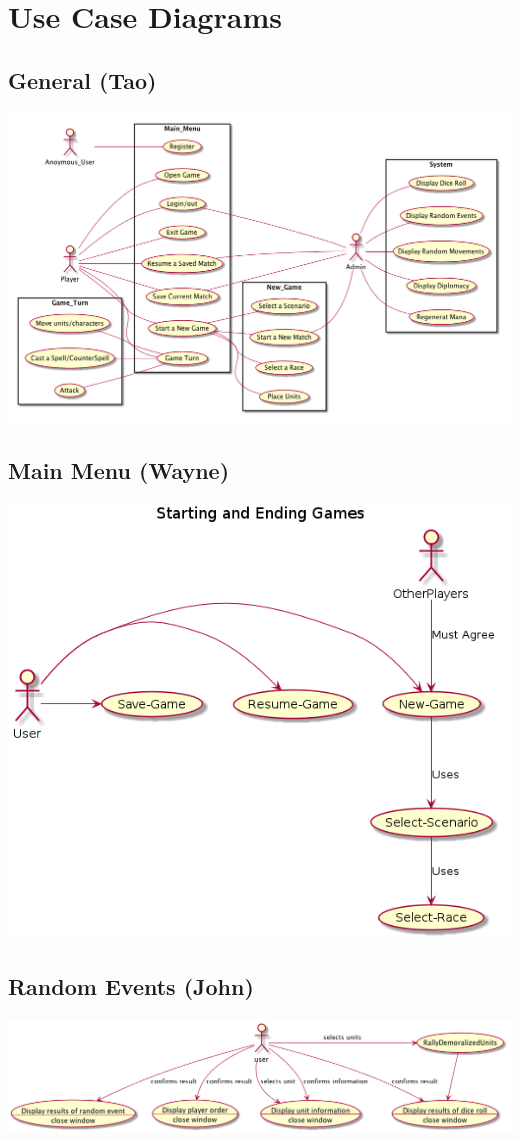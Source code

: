 \documentclass[12pt,letterpaper]{scrreprt}
\begin{document}
\chapter{Use Case Diagrams}

\section{General (Tao)}
\includegraphics[scale=0.4]{Tao-usecase-diagrams.png} 
\section{Main Menu (Wayne)}
\includegraphics[scale=0.6]{menuSelection.png}
\section{Random Events (John)}
\includegraphics[scale=0.4]{usecasesJohn.png}
\end{document}
